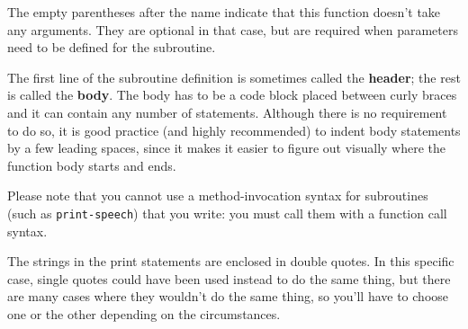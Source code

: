 The empty parentheses after the name indicate that this function
doesn't take any arguments. They are optional in that case, but are 
required when parameters need to be defined for the subroutine.

The first line of the subroutine definition is sometimes called 
the {\bf header}; the rest is called the {\bf body}.  The body 
has to be a code block placed between curly braces and it can contain
any number of statements. Although there is no requirement to do 
so, it is good practice (and highly recommended) to indent body 
statements by a few leading spaces, since it makes it easier to 
figure out visually where the function body starts and ends.


Please note that you cannot use a method-invocation syntax 
for subroutines (such as \verb"print-speech") that you write: 
you must call them with a function call syntax.

The strings in the print statements are enclosed in double
quotes.  In this specific case, single quotes could have been 
used instead to do the same thing, but there are many cases 
where they wouldn't do the same thing, so you'll have to 
choose one or the other depending on the circumstances.


